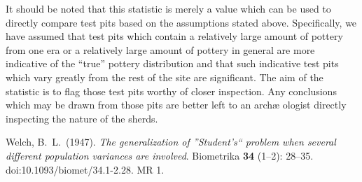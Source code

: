 \documentclass[conference]{IEEEtran}
\begin{document}
It should be noted that this statistic is merely a value which can be used to
directly compare test pits based on the assumptions stated above. Specifically,
we have assumed that test pits which contain a relatively large amount of
pottery from one era or a relatively large amount of pottery in general are more
indicative of the ``true'' pottery distribution and that such indicative test
pits which vary greatly from the rest of the site are significant. The aim of
the statistic is to flag those test pits worthy of closer inspection. Any
conclusions which may be drawn from those pits are better left to an arch\ae
ologist directly inspecting the nature of the sherds.

\begin{thebibliography}{1}
    Welch, B.~L.~(1947). \emph{The generalization of ''Student's`` problem when
    several different population variances are involved}. Biometrika \textbf{34}
    (1--2): 28--35. doi:10.1093/biomet/34.1-2.28. MR 1.
\end{thebibliography}
\end{document}
